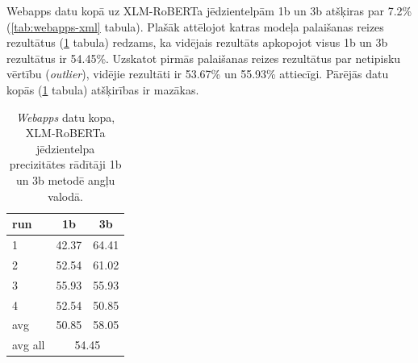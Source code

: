 Webapps datu kopā uz XLM-RoBERTa jēdzientelpām 1b un 3b atšķiras par 
7.2\% (\ref{tab:webapps-xml} tabula). Plašāk attēlojot katras modeļa palaišanas reizes rezultātus (\ref{tab:13b-webapps} tabula) redzams, ka vidējais rezultāts apkopojot visus 1b un 3b rezultātus ir 54.45\%. Uzskatot pirmās palaišanas reizes rezultātus par netipisku vērtību (\textit{outlier}), vidējie rezultāti ir 53.67\% un 55.93\% attiecīgi. Pārējās datu kopās (\ref{tab:13b-webapps} tabula) atšķirības ir mazākas.



\begin{table}[htbp]
  \centering
  \caption{\textit{Webapps} datu kopa, XLM-RoBERTa jēdzientelpa precizitātes rādītāji 1b un 3b metodē angļu valodā.}
    \begin{tabular}{lcc}\toprule
    run   & 1b & 3b \\\midrule
    1 & 42.37 & 64.41 \\
    2 & 52.54 & 61.02 \\
    3 & 55.93 & 55.93 \\
    4 & 52.54 & 50.85 \\\midrule
    avg   & 50.85 & 58.05 \\
    avg all & \multicolumn{2}{c}{54.45} \\\bottomrule
    \end{tabular}%
  \label{tab:13b-webapps}%
\end{table}%



